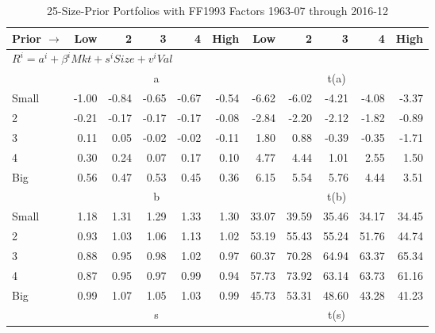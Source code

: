 
\begin{table}[!ht]
\centering
\caption{25-Size-Prior Portfolios with FF1993 Factors 1963-07 through 2016-12}
\begin{tabular}{lrrrrrrrrrr}
  \toprule
    Prior $\rightarrow$ & Low & 2 & 3 & 4 & High & Low & 2 & 3 & 4 & High \\ 
  \midrule
  \multicolumn{11}{l}{$R^i=a^i+\beta^iMkt+s^iSize+v^iVal$} \\

  
    
      & \multicolumn{5}{c}{a} & \multicolumn{5}{c}{t(a)}
    
    \\
      \cmidrule(r){2-6} \cmidrule(r){7-11}

    Small   & -1.00  & -0.84  & -0.65  & -0.67  & -0.54  & -6.62  & -6.02  & -4.21  & -4.08  & -3.37  \\
         2  & -0.21  & -0.17  & -0.17  & -0.17  & -0.08  & -2.84  & -2.20  & -2.12  & -1.82  & -0.89  \\
         3  & 0.11  & 0.05  & -0.02  & -0.02  & -0.11  & 1.80  & 0.88  & -0.39  & -0.35  & -1.71  \\
         4  & 0.30  & 0.24  & 0.07  & 0.17  & 0.10  & 4.77  & 4.44  & 1.01  & 2.55  & 1.50  \\
    Big     & 0.56  & 0.47  & 0.53  & 0.45  & 0.36  & 6.15  & 5.54  & 5.76  & 4.44  & 3.51  \\

  
    
      & \multicolumn{5}{c}{b} & \multicolumn{5}{c}{t(b)}
    
    \\
      \cmidrule(r){2-6} \cmidrule(r){7-11}

    Small   & 1.18  & 1.31  & 1.29  & 1.33  & 1.30  & 33.07  & 39.59  & 35.46  & 34.17  & 34.45  \\
         2  & 0.93  & 1.03  & 1.06  & 1.13  & 1.02  & 53.19  & 55.43  & 55.24  & 51.76  & 44.74  \\
         3  & 0.88  & 0.95  & 0.98  & 1.02  & 0.97  & 60.37  & 70.28  & 64.94  & 63.37  & 65.34  \\
         4  & 0.87  & 0.95  & 0.97  & 0.99  & 0.94  & 57.73  & 73.92  & 63.14  & 63.73  & 61.16  \\
    Big     & 0.99  & 1.07  & 1.05  & 1.03  & 0.99  & 45.73  & 53.31  & 48.60  & 43.28  & 41.23  \\

  
    
      & \multicolumn{5}{c}{s} & \multicolumn{5}{c}{t(s)}
    

\end{tabular}
\end{table}
